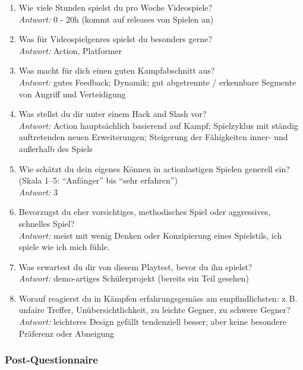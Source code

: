 \documentclass[../Main.tex]{subfiles}
\begin{document}
\begin{enumerate}[label=\textbf{P\arabic*}, leftmargin=1.5cm, itemsep=0.8em]
\item Wie viele Stunden spielst du pro Woche Videospiele? \\
    \textit{Antwort:} 0 - 20h (kommt auf releases von Spielen an)

\item Was für Videospielgenres spielst du besonders gerne? \\
    \textit{Antwort:} Action, Platformer

\item Was macht für dich einen guten Kampfabschnitt aus? \\
    \textit{Antwort:} gutes Feedback; Dynamik; gut abgetrennte / erkennbare Segmente von Angriff und Verteidigung

\item Was stellst du dir unter einem Hack and Slash vor? \\
    \textit{Antwort:} Action hauptsächlich basierend auf Kampf; Spielzyklus mit ständig auftretenden neuen Erweiterungen; Steigerung der Fähigkeiten inner- und außerhalb des Spiels

\item Wie schätzt du dein eigenes Können in actionlastigen Spielen generell ein? (Skala 1--5: \enquote{Anfänger} bis \enquote{sehr erfahren}) \\
    \textit{Antwort:} 3

\item Bevorzugst du eher vorsichtiges, methodisches Spiel oder aggressives, schnelles Spiel? \\
    \textit{Antwort:} meist mit wenig Denken oder Konzipierung eines Spielstils, ich spiele wie ich mich fühle.

\item Was erwartest du dir von diesem Playtest, bevor du ihn spielst? \\
    \textit{Antwort:} demo-artiges Schülerprojekt (bereits ein Teil gesehen)

\item Worauf reagierst du in Kämpfen erfahrungsgemäss am empfindlichsten: z.\,B. unfaire Treffer, Unübersichtlichkeit, zu leichte Gegner, zu schwere Gegner? \\
    \textit{Antwort:} leichteres Design gefällt tendenziell besser; aber keine besondere Präferenz oder Abneigung
\end{enumerate}

\subsubsection{Post-Questionnaire}
\end{document}
